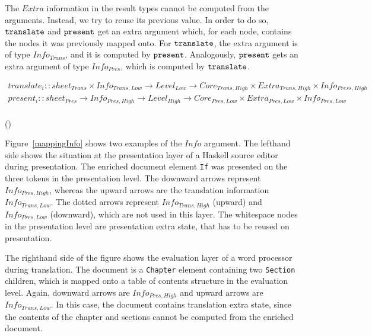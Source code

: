 The $Extra$ information in the result types cannot be computed from the arguments. Instead, we try to reuse its previous value. In order to do so, ${\tt translate}$ and ${\tt present}$ get an extra argument which, for each node, contains the nodes it was previously mapped onto. For ${\tt translate}$, the extra argument is of type $Info_{Trans}$, and it is computed by ${\tt present}$. Analogously, ${\tt present}$ gets an extra argument of type $Info_{Pres}$, which is computed by ${\tt translate}$. 

\begin{small}\begin{align*}
translate_{i} :: sheet_{Trans} \times Info_{Trans,Low} \rightarrow Level_{Low} \rightarrow Core_{Trans,High}  \times Extra_{Trans,High}  \times Info_{Press,High}\\
present_{i} :: sheet_{Pres}  \rightarrow Info_{Pres,High} \rightarrow  Level_{High} \rightarrow Core_{Pres,Low} \times Extra_{Pres,Low}   \times Info_{Pres,Low} \\
\end{align*} 
\end{small}
{\centering ()\\}


Figure~\ref{mappingInfo} shows two examples of the $Info$ argument. The lefthand side shows the situation at the presentation layer of a Haskell source editor during presentation.  The enriched document element \verb|If|  was presented on the three tokens in the presentation level. The downward arrows represent $Info_{Pres,High}$, whereas the upward arrows are the translation information $Info_{Trans, Low}$. The dotted arrows represent $Info_{Trans,High}$ (upward) and $Info_{Pres,Low}$ (downward), which are not used in this layer. The whitespace nodes in the presentation level are presentation extra state, that has to be reused on presentation. 

The righthand side of the figure shows the evaluation layer of a word processor during translation. The document is a \verb|Chapter| element containing two \verb|Section| children, which is mapped onto a table of contents structure in the evaluation level. Again, downward arrows are $Info_{Pres,High}$ and upward arrows are $Info_{Trans,Low}$.  In this case, the document contains translation extra state, since the contents of the chapter and sections cannot be computed from the enriched document.  

